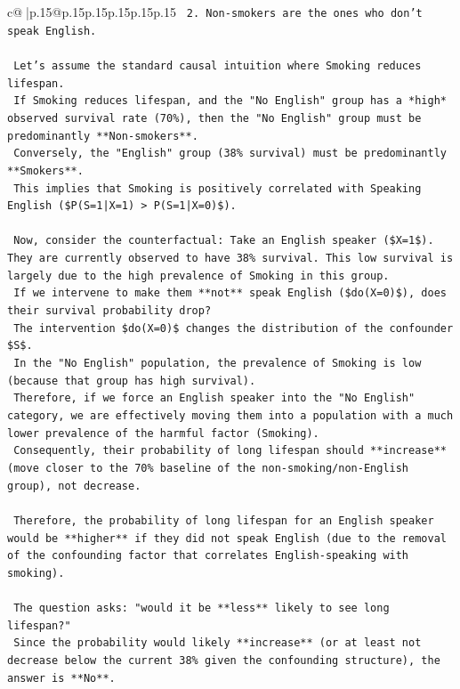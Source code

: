 \documentclass{article}
\begin{document}
{\begin{supertabular}{c@{$\;$}|p{.15\linewidth}@{}p{.15\linewidth}p{.15\linewidth}p{.15\linewidth}p{.15\linewidth}p{.15\linewidth}}
{{{\texttt{        2.  Non{-}smokers are the ones who don't speak English.} \\
\\ 
\texttt{        Let's assume the standard causal intuition where Smoking reduces lifespan.} \\
\texttt{        If Smoking reduces lifespan, and the "No English" group has a *high* observed survival rate (70\%), then the "No English" group must be predominantly **Non{-}smokers**.} \\
\texttt{        Conversely, the "English" group (38\% survival) must be predominantly **Smokers**.} \\
\texttt{        This implies that Smoking is positively correlated with Speaking English (\$P(S=1|X=1) > P(S=1|X=0)\$).} \\
\\ 
\texttt{        Now, consider the counterfactual: Take an English speaker (\$X=1\$). They are currently observed to have 38\% survival. This low survival is largely due to the high prevalence of Smoking in this group.} \\
\texttt{        If we intervene to make them **not** speak English (\$do(X=0)\$), does their survival probability drop?} \\
\texttt{        The intervention \$do(X=0)\$ changes the distribution of the confounder \$S\$.} \\
\texttt{        In the "No English" population, the prevalence of Smoking is low (because that group has high survival).} \\
\texttt{        Therefore, if we force an English speaker into the "No English" category, we are effectively moving them into a population with a much lower prevalence of the harmful factor (Smoking).} \\
\texttt{        Consequently, their probability of long lifespan should **increase** (move closer to the 70\% baseline of the non{-}smoking/non{-}English group), not decrease.} \\
\\ 
\texttt{        Therefore, the probability of long lifespan for an English speaker would be **higher** if they did not speak English (due to the removal of the confounding factor that correlates English{-}speaking with smoking).} \\
\\ 
\texttt{        The question asks: "would it be **less** likely to see long lifespan?"} \\
\texttt{        Since the probability would likely **increase** (or at least not decrease below the current 38\% given the confounding structure), the answer is **No**.} \\
}}}
\end{supertabular}}
\end{document}
